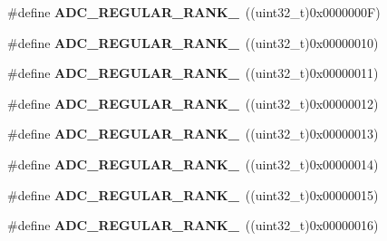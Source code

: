 \begin{DoxyCompactItemize}
\item 
\hypertarget{group___a_d_c__regular__rank_ga36d371d1ced7f233fdf59ffc67234b4d}{\#define {\bfseries A\-D\-C\-\_\-\-R\-E\-G\-U\-L\-A\-R\-\_\-\-R\-A\-N\-K\-\_}~((uint32\-\_\-t)0x0000000\-F)}\label{group___a_d_c__regular__rank_ga36d371d1ced7f233fdf59ffc67234b4d}

\item 
\hypertarget{group___a_d_c__regular__rank_ga85f2ea453f67b9a5aad74aa94b696adb}{\#define {\bfseries A\-D\-C\-\_\-\-R\-E\-G\-U\-L\-A\-R\-\_\-\-R\-A\-N\-K\-\_}~((uint32\-\_\-t)0x00000010)}\label{group___a_d_c__regular__rank_ga85f2ea453f67b9a5aad74aa94b696adb}

\item 
\hypertarget{group___a_d_c__regular__rank_ga77b1011fd0643938847b52613551c9a9}{\#define {\bfseries A\-D\-C\-\_\-\-R\-E\-G\-U\-L\-A\-R\-\_\-\-R\-A\-N\-K\-\_}~((uint32\-\_\-t)0x00000011)}\label{group___a_d_c__regular__rank_ga77b1011fd0643938847b52613551c9a9}

\item 
\hypertarget{group___a_d_c__regular__rank_ga7eb8c1754d810e8521dd9ad52f6ef1fa}{\#define {\bfseries A\-D\-C\-\_\-\-R\-E\-G\-U\-L\-A\-R\-\_\-\-R\-A\-N\-K\-\_}~((uint32\-\_\-t)0x00000012)}\label{group___a_d_c__regular__rank_ga7eb8c1754d810e8521dd9ad52f6ef1fa}

\item 
\hypertarget{group___a_d_c__regular__rank_gaf1669da3a5c505b5fed06c6e45843d40}{\#define {\bfseries A\-D\-C\-\_\-\-R\-E\-G\-U\-L\-A\-R\-\_\-\-R\-A\-N\-K\-\_}~((uint32\-\_\-t)0x00000013)}\label{group___a_d_c__regular__rank_gaf1669da3a5c505b5fed06c6e45843d40}

\item 
\hypertarget{group___a_d_c__regular__rank_ga3195ba4fde9497f4dd6a76edeb187a6f}{\#define {\bfseries A\-D\-C\-\_\-\-R\-E\-G\-U\-L\-A\-R\-\_\-\-R\-A\-N\-K\-\_}~((uint32\-\_\-t)0x00000014)}\label{group___a_d_c__regular__rank_ga3195ba4fde9497f4dd6a76edeb187a6f}

\item 
\hypertarget{group___a_d_c__regular__rank_ga07cfe05d2dba818ab540671162b3c1b7}{\#define {\bfseries A\-D\-C\-\_\-\-R\-E\-G\-U\-L\-A\-R\-\_\-\-R\-A\-N\-K\-\_}~((uint32\-\_\-t)0x00000015)}\label{group___a_d_c__regular__rank_ga07cfe05d2dba818ab540671162b3c1b7}

\item 
\hypertarget{group___a_d_c__regular__rank_ga318871d5705000ccf8500d5b91c4428b}{\#define {\bfseries A\-D\-C\-\_\-\-R\-E\-G\-U\-L\-A\-R\-\_\-\-R\-A\-N\-K\-\_}~((uint32\-\_\-t)0x00000016)}\label{group___a_d_c__regular__rank_ga318871d5705000ccf8500d5b91c4428b}


\end{DoxyCompactItemize}
